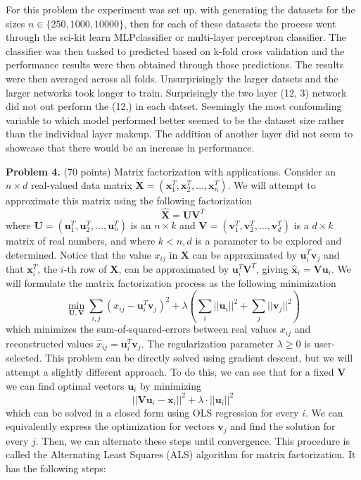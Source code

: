 \documentclass[twoside]{article}
\begin{document}
For this problem the experiment was set up, with generating the datasets for the sizes $n \in \{ 250, 1000, 10000\} $, then for each of these datasets the process went through the sci-kit learn MLPclassifier or multi-layer perceptron  classifier. The classifier was then tasked to predicted based on k-fold cross validation and the performance results were then obtained through those predictions.  The results were then averaged across all folds. Unsurprisingly the larger datsets and the larger networks took longer to train. Surprisingly the two layer (12, 3) network did not out perform the (12,) in each datset. Seemingly the most confounding variable to which model performed better seemed to be the dataset size rather than the individual layer makeup. The addition of another layer did not seem to showcase that there would be an increase in performance. 


\textbf{Problem 4.} (70 points) Matrix factorization with applications. Consider an $n\times d$ real-valued data matrix $\mathbf{X}=(\mathbf{x}_{1}^{T},\mathbf{x}_{2}^{T},\ldots,\mathbf{x}_{n}^{T})$. We will attempt to approximate this matrix using the following factorization
\[
\hat{\mathbf{X}}=\mathbf{U}\mathbf{V}^{T}
\]
where $\mathbf{U}=(\mathbf{u}_{1}^{T},\mathbf{u}_{2}^{T},\ldots,\mathbf{u}_{n}^{T})$ is an $n\times k$ and $\mathbf{V}=(\mathbf{v}_{1}^{T},\mathbf{v}_{2}^{T},\ldots,\mathbf{v}_{d}^{T})$ is a $d\times k$ matrix of real numbers, and where $k<n,d$ is a parameter to be explored and determined. Notice that the value $x_{ij}$ in \textbf{$\mathbf{X}$} can be approximated by $\mathbf{u}_{i}^{T}\mathbf{v}_{j}$ and that $\mathbf{x}_{i}^{T}$, the $i$-th row of $\mathbf{X}$, can be approximated by $\mathbf{u}_{i}^{T}\mathbf{V}^T$, giving $\hat{\mathbf{x}}_{i}=\mathbf{V}\mathbf{u}_{i}$. We will formulate the matrix factorization process as the following minimization
\[
\underset{\mathbf{U},\mathbf{V}}{\min}\sum_{i,j}(x_{ij}-\mathbf{u}_{i}^{T}\mathbf{v}_{j})^{2}+\lambda(\sum_{i}||\mathbf{u}_{i}||^{2}+\sum_{j}||\mathbf{v}_{j}||^{2})
\]
which minimizes the sum-of-squared-errors between real values $x_{ij}$ and reconstructed values  $\hat{x}_{ij}=\mathbf{u}_{i}^{T}\mathbf{v}_{j}$. The regularization parameter $\lambda\geq0$ is user-selected. This problem can be directly solved using gradient descent, but we will attempt a slightly different approach. To do this, we can see that for a fixed $\mathbf{V}$ we can find optimal vectors $\mathbf{u}_{i}$ by minimizing
\[
||\mathbf{V}\mathbf{u}_{i}-\mathbf{x}_{i}||^{2}+\lambda\cdot||\mathbf{u}_{i}||^{2}
\]
which can be solved in a closed form using OLS regression for every $i$. We can equivalently express the optimization for vectors $\mathbf{v}_{j}$ and find the solution for every $j$. Then, we can alternate these steps until convergence. This procedure is called the Alternating Least Squares (ALS) algorithm for matrix factorization. It has the following steps:
\end{document}
